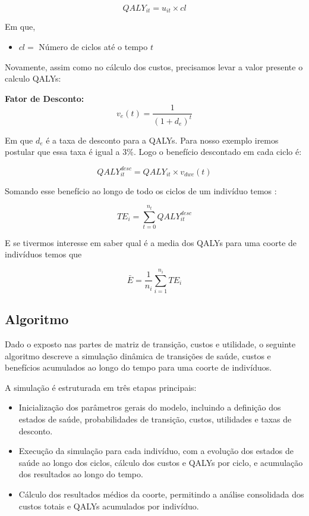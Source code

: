 \documentclass[12pt, a4paper, openany]{book}
\numberwithin{equation}{chapter}
\numberwithin{table}{chapter}
\numberwithin{figure}{chapter}
\theoremstyle{break}
\begin{document}
    \[
    QALY_{it} = u_{it} \times cl
    \]


Em que,

\begin{itemize}
    \item $cl =$ Número de ciclos até o tempo $t$
\end{itemize}


Novamente, assim como no cálculo dos custos, precisamos levar a valor presente o calculo QALYs: 

 \textbf{Fator de Desconto:}
    \[
    v_{e}(t) = \frac{1}{(1 + d_e)^t}
    \]


Em que  $d_e$ é a taxa de desconto para a QALYs. Para nosso exemplo iremos postular que essa taxa é igual a $3\%$. Logo o benefício descontado em cada ciclo é:

    \[
    QALY_{it}^{desc} = QALY_{it} \times v_{dwc}(t)
    \]


Somando esse benefício ao longo de todo os ciclos de um indivíduo temos :

    \[
    TE_i = \sum_{t=0}^{n_t} QALY_{it}^{desc}
    \]


E se tivermos interesse em saber qual é a media dos QALYs para uma coorte de indivíduos temos que 


    \[
    \bar{E} = \frac{1}{n_i} \sum_{i=1}^{n_i} TE_i
    \]


\subsection{Algoritmo}

Dado o exposto nas partes de matriz de transição, custos e utilidade, o seguinte algoritmo descreve a simulação dinâmica de transições de saúde, custos e benefícios acumulados ao longo do tempo para uma coorte de indivíduos. 

A simulação é estruturada em três etapas principais:


\begin{itemize}
    \item Inicialização dos parâmetros gerais do modelo, incluindo a definição dos estados de saúde, probabilidades de transição, custos, utilidades e taxas de desconto.


    \item Execução da simulação para cada indivíduo, com a evolução dos estados de saúde ao longo dos ciclos, cálculo dos custos e QALYs por ciclo, e acumulação dos resultados ao longo do tempo.


    \item Cálculo dos resultados médios da coorte, permitindo a análise consolidada dos custos totais e QALYs acumulados por indivíduo.
\end{itemize}
\end{document}
